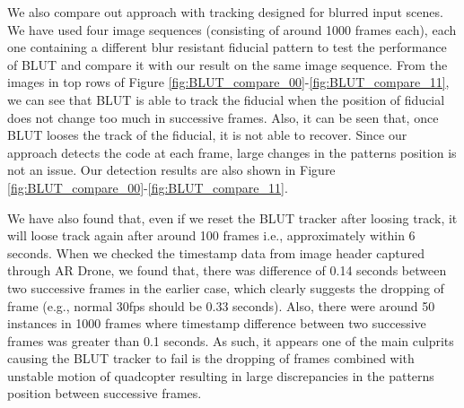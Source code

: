 \documentclass[runningheads]{llncs}
\begin{document}
We also compare out approach with tracking designed for blurred input scenes. 
We have used four image sequences (consisting of around 1000 frames each), each
one containing a different blur resistant fiducial pattern to test the performance of
BLUT\cite{Wu:2011} and compare it with our result on the same image sequence.
From the images in top rows of Figure
\ref{fig:BLUT_compare_00}-\ref{fig:BLUT_compare_11}, we can see that BLUT is able to track the fiducial when the position of fiducial does not change too much in successive frames. Also, it can be seen that, once BLUT looses the track of the fiducial, it is not able to recover. 
Since our approach detects the code at each frame, large changes in the patterns
position is not an issue.   Our detection results are also shown in Figure
\ref{fig:BLUT_compare_00}-\ref{fig:BLUT_compare_11}.

We have also found that, even if we reset the BLUT tracker after loosing track,
it will loose track again after around 100 frames i.e., approximately within 6
seconds. When we checked the timestamp data from image header captured through
AR Drone, we found that, there was difference of 0.14 seconds between two
successive frames in the earlier case, which clearly suggests the dropping of
frame (e.g., normal 30fps should be 0.33 seconds). Also,  there were around 50
instances in 1000 frames where timestamp difference between two successive
frames was greater than 0.1 seconds. As such, it appears one of the main
culprits causing the BLUT tracker to fail is the dropping of frames combined
with unstable motion of quadcopter resulting in large discrepancies in the
patterns position between successive frames.
\end{document}
